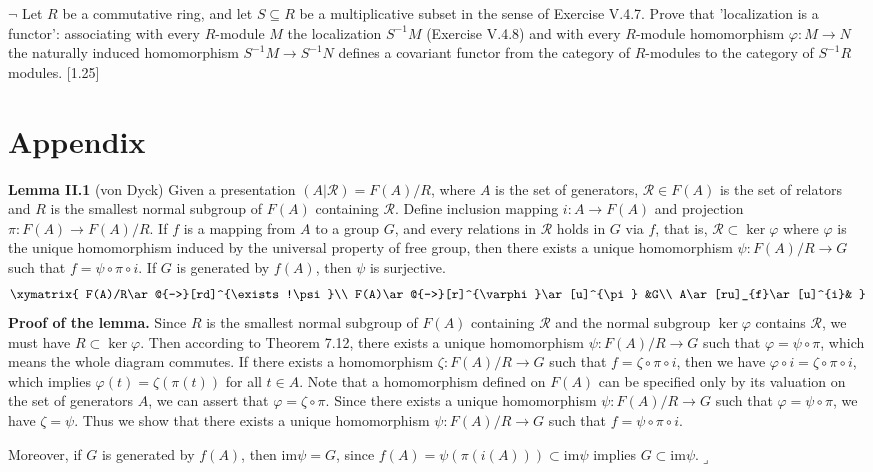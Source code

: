 \documentclass[12pt,letterpaper,boxed]{hmcpset}
\begin{document}
\begin{problem}[1.4]
$\neg$ Let $R$ be a commutative ring, and let $S \subseteq R$ be a multiplicative subset in the sense of Exercise V.4.7. Prove that 'localization is a functor': associating with every $R$-module $M$ the localization $S^{-1} M$ (Exercise V.4.8) and with every $R$-module homomorphism $\varphi: M \rightarrow N$ the naturally induced homomorphism $S^{-1} M \rightarrow S^{-1} N$ defines a covariant functor from the category of $R$-modules to the category of $S^{-1} R$ modules. [1.25]
\end{problem}
\begin{solution}
\end{solution}
\newpage
\section{Appendix}
\hypertarget{Lemma II.1}{}
\textbf{Lemma II.1} (von Dyck)
Given a presentation $(A|\mathscr{R})=F(A)/R$, where $A$ is the set of generators, $\mathscr{R}\in F(A)$ is the set of relators and $R$ is the smallest normal subgroup of $F(A)$ containing $\mathscr{R}$. Define inclusion mapping $i:A\to F(A)$ and projection $\pi:F(A)\to F(A)/R$. If $f$ is a mapping from $A$ to a group $G$, and every relations in $\mathscr{R}$ holds in $G$ via $f$, that is, $\mathscr{R}\subset\ker\varphi$ where $\varphi$ is the unique homomorphism induced by the universal property of free group, then there exists a unique homomorphism $\psi:F(A)/R\to G$ such that $f=\psi\circ\pi\circ i$. If $G$ is generated by $f(A)$, then $\psi$ is surjective.
\[\xymatrix{
	F(A)/R\ar@{-->}[rd]^{\exists!\psi}\\
	F(A)\ar@{-->}[r]^{\varphi}\ar[u]^{\pi} &G\\
	A\ar[ru]_{f}\ar[u]^{i}&    
}\]
\textbf{Proof of the lemma.} Since $R$ is the smallest normal subgroup of $F(A)$ containing $\mathscr{R}$ and the normal subgroup $\ker\varphi$ contains $\mathscr{R}$, we must have $R\subset\ker\varphi$. Then according to Theorem 7.12, there exists a unique homomorphism $\psi:F(A)/R\to G$ such that $\varphi=\psi\circ\pi$, which means the whole diagram commutes. If there exists a homomorphism $\zeta:F(A)/R\to G$ such that $f=\zeta\circ\pi\circ i$, then we have $\varphi\circ i=\zeta\circ\pi\circ i$, which implies $\varphi(t)= \zeta(\pi(t))$ for all $t\in A$. Note that a homomorphism  defined on $F(A)$ can be specified only by its valuation on the set of generators $A$, we can assert that $\varphi=\zeta\circ\pi$. Since there exists a unique homomorphism $\psi:F(A)/R\to G$ such that $\varphi=\psi\circ\pi$, we have $\zeta=\psi$. Thus we show that there exists a unique homomorphism $\psi:F(A)/R\to G$ such that $f=\psi\circ\pi\circ i$.

Moreover, if $G$ is generated by $f(A)$, then $\mathrm{im}\psi=G$, since $f(A)=\psi(\pi( i(A)))\subset\mathrm{im}\psi$ implies $G\subset\mathrm{im}\psi$.\hfill$\lrcorner$


\newpage





\end{document}
